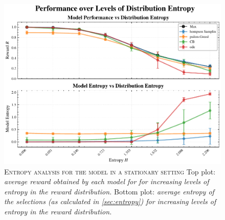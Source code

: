 \begin{figure}[ht]
    \centering
    \includegraphics[width=1.\textwidth]{figures/entropy_performance_plot.pdf}
    \caption{\textsc{Entropy analysis for the model in a stationary setting} Top plot: \textit{average reward obtained by each model for for increasing levels of entropy in the reward distribution.} Bottom plot: \textit{average entropy of the selections (as calculated in \ref{sec:entropy}) for
    increasing levels of entropy in the reward distribution.}}
\end{figure}\label{fig:entropy_distr}




